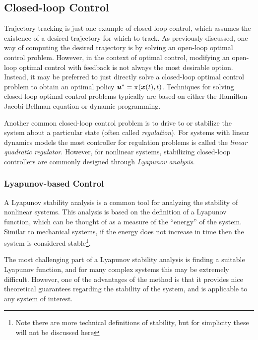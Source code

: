 \subsection{Closed-loop Control}
Trajectory tracking is just one example of closed-loop control, which assumes the existence of a desired trajectory for which to track. As previously discussed, one way of computing the desired trajectory is by solving an open-loop optimal control problem. However, in the context of optimal control, modifying an open-loop optimal control with feedback is not always the most desirable option. Instead, it may be preferred to just directly solve a closed-loop optimal control problem to obtain an optimal policy $\bm{u}^* = \pi(\bm{x}(t),t)$. Techniques for solving closed-loop optimal control problems typically are based on either the Hamilton-Jacobi-Bellman equation or dynamic programming.

Another common closed-loop control problem is to drive to or stabilize the system about a particular state (often called \textit{regulation}). For systems with linear dynamics models the most controller for regulation problems is called the \textit{linear quadratic regulator}. However, for nonlinear systems, stabilizing closed-loop controllers are commonly designed through \textit{Lyapunov analysis}\cite{SlotineLi1991}.

\subsubsection{Lyapunov-based Control}
A Lyapunov stability analysis is a common tool for analyzing the stability of nonlinear systems. This analysis is based on the definition of a Lyapunov function, which can be thought of as a measure of the ``energy'' of the system. Similar to mechanical systems, if the energy does not increase in time then the system is considered stable\footnote{Note there are more technical definitions of stability, but for simplicity these will not be discussed here}.

The most challenging part of a Lyapunov stability analysis is finding a suitable Lyapunov function, and for many complex systems this may be extremely difficult. However, one of the advantages of the method is that it provides nice theoretical guarantees regarding the stability of the system, and is applicable to any system of interest.

